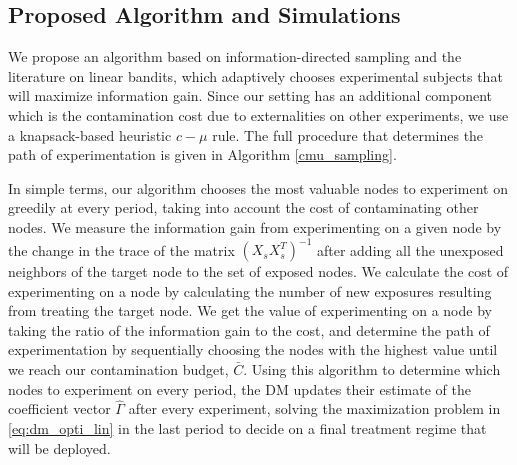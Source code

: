 \documentclass[11pt,a4paper]{article}
\begin{document}

\subsection{Proposed Algorithm and Simulations}

We propose an algorithm based on information-directed sampling and the literature on linear bandits, which adaptively chooses experimental subjects that will maximize information gain. Since our setting has an additional component which is the contamination cost due to externalities on other experiments, we use a knapsack-based heuristic $c-\mu$ rule. The full procedure that determines the path of experimentation is given in Algorithm \ref{cmu_sampling}.

In simple terms, our algorithm chooses the most valuable nodes to experiment on greedily at every period, taking into account the cost of contaminating other nodes. We measure the information gain from experimenting on a given node by the change in the trace of the matrix $( X_s X_s^T)^{-1}$ after adding all the unexposed neighbors of the target node to the set of exposed nodes. We calculate the cost of experimenting on a node by calculating the number of new exposures resulting from treating the target node. We get the value of experimenting on a node by taking the ratio of the information gain to the cost, and determine the path of experimentation by sequentially choosing the nodes with the highest value until we reach our contamination budget, $\bar{C}$. Using this algorithm to determine which nodes to experiment on every period, the DM updates their estimate of the coefficient vector $\hat \Gamma$ after every experiment, solving the maximization problem in \eqref{eq:dm_opti_lin} in the last period to decide on a final treatment regime that will be deployed.
\end{document}
